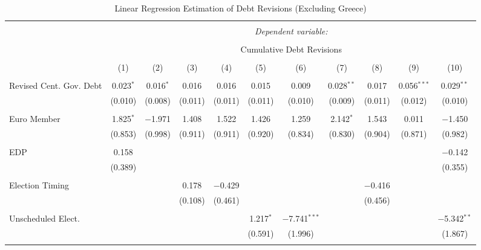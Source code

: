 
\begin{table}[!htbp] \centering 
  \caption{Linear Regression Estimation of Debt Revisions (Excluding Greece)} 
  \label{results_no_greece} 
\tiny 
\begin{tabular}{@{\extracolsep{5pt}}lcccccccccc} 
\\[-1.8ex]\hline 
\hline \\[-1.8ex] 
 & \multicolumn{10}{c}{\textit{Dependent variable:}} \\ 
\cline{2-11} 
\\[-1.8ex] & \multicolumn{10}{c}{Cumulative Debt Revisions} \\ 
\\[-1.8ex] & (1) & (2) & (3) & (4) & (5) & (6) & (7) & (8) & (9) & (10)\\ 
\hline \\[-1.8ex] 
 Revised Cent. Gov. Debt & 0.023$^{*}$ & 0.016$^{*}$ & 0.016 & 0.016 & 0.015 & 0.009 & 0.028$^{**}$ & 0.017 & 0.056$^{***}$ & 0.029$^{**}$ \\ 
  & (0.010) & (0.008) & (0.011) & (0.011) & (0.011) & (0.010) & (0.009) & (0.011) & (0.012) & (0.010) \\ 
  & & & & & & & & & & \\ 
 Euro Member & 1.825$^{*}$ & $-$1.971 & 1.408 & 1.522 & 1.426 & 1.259 & 2.142$^{*}$ & 1.543 & 0.011 & $-$1.450 \\ 
  & (0.853) & (0.998) & (0.911) & (0.911) & (0.920) & (0.834) & (0.830) & (0.904) & (0.871) & (0.982) \\ 
  & & & & & & & & & & \\ 
 EDP & 0.158 &  &  &  &  &  &  &  &  & $-$0.142 \\ 
  & (0.389) &  &  &  &  &  &  &  &  & (0.355) \\ 
  & & & & & & & & & & \\ 
 Election Timing &  &  & 0.178 & $-$0.429 &  &  &  & $-$0.416 &  &  \\ 
  &  &  & (0.108) & (0.461) &  &  &  & (0.456) &  &  \\ 
  & & & & & & & & & & \\ 
 Unscheduled Elect. &  &  &  &  & 1.217$^{*}$ & $-$7.741$^{***}$ &  &  &  & $-$5.342$^{**}$ \\ 
  &  &  &  &  & (0.591) & (1.996) &  &  &  & (1.867) \\ 
  & & & & & & & & & & \\ 

\end{tabular}
\end{table}

